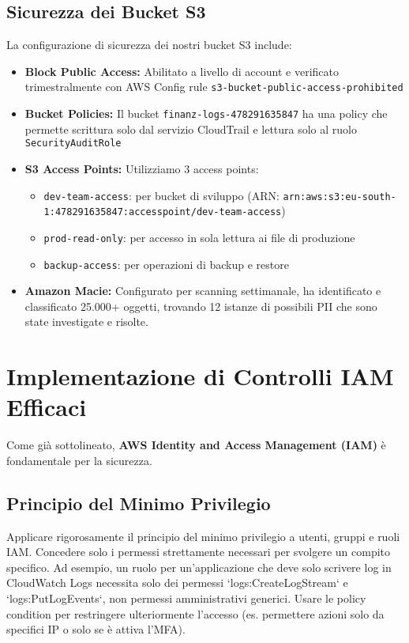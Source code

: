 \subsection{Sicurezza dei Bucket S3}
\label{subsec:s3-security}
La configurazione di sicurezza dei nostri bucket S3 include:
\begin{itemize}
    \item \textbf{Block Public Access:} Abilitato a livello di account e verificato trimestralmente con AWS Config rule \texttt{s3-bucket-public-access-prohibited}
    \item \textbf{Bucket Policies:} Il bucket \texttt{finanz-logs-478291635847} ha una policy che permette scrittura solo dal servizio CloudTrail e lettura solo al ruolo \texttt{SecurityAuditRole}
    \item \textbf{S3 Access Points:} Utilizziamo 3 access points:
        \begin{itemize}
            \item \texttt{dev-team-access}: per bucket di sviluppo (ARN: \texttt{arn:aws:s3:eu-south-1:478291635847:accesspoint/dev-team-access})
            \item \texttt{prod-read-only}: per accesso in sola lettura ai file di produzione
            \item \texttt{backup-access}: per operazioni di backup e restore
        \end{itemize}
    \item \textbf{Amazon Macie:} Configurato per scanning settimanale, ha identificato e classificato 25.000+ oggetti, trovando 12 istanze di possibili PII che sono state investigate e risolte.
\end{itemize}

\section{Implementazione di Controlli IAM Efficaci}
\label{sec:iam-implementation}
Come già sottolineato, \textbf{AWS Identity and Access Management (IAM)} è fondamentale per la sicurezza.

\subsection{Principio del Minimo Privilegio}
\label{subsec:least-privilege-impl}
Applicare rigorosamente il principio del minimo privilegio a utenti, gruppi e ruoli IAM. Concedere solo i permessi strettamente necessari per svolgere un compito specifico. Ad esempio, un ruolo per un'applicazione che deve solo scrivere log in CloudWatch Logs necessita solo dei permessi `logs:CreateLogStream` e `logs:PutLogEvents`, non permessi amministrativi generici. Usare le policy condition per restringere ulteriormente l'accesso (es. permettere azioni solo da specifici IP o solo se è attiva l'MFA).

